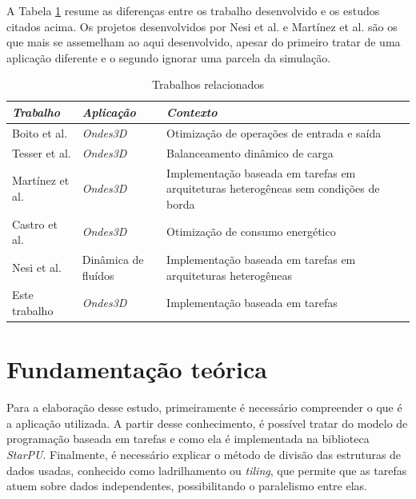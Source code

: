 \documentclass[cic,tc]{iiufrgs}
\begin{document}
A Tabela \ref{tbl:related_works} resume as diferenças entre os trabalho desenvolvido e os estudos citados acima. Os projetos desenvolvidos por Nesi et al. e Martínez et al. são
os que mais se assemelham ao aqui desenvolvido, apesar do primeiro tratar de uma aplicação diferente e o segundo ignorar uma parcela da simulação.

\begin{table}[htb!]
    \caption{Trabalhos relacionados}
    \begin{center}
        \begin{tabular}{l|l|p{60mm}}
            \textit{Trabalho} & \textit{Aplicação} & \textit{Contexto} \\
            \hline
            \hline
            Boito et al.    & \textit{Ondes3D} & Otimização de operações de entrada e saída \\
            Tesser et al.   & \textit{Ondes3D} & Balanceamento dinâmico de carga             \\
            Martínez et al. & \textit{Ondes3D} & Implementação baseada em tarefas em arquiteturas heterogêneas sem condições de borda             \\
            Castro et al.   & \textit{Ondes3D} & Otimização de consumo energético             \\
            Nesi et al.     & Dinâmica de fluídos & Implementação baseada em tarefas em arquiteturas heterogêneas \\
            Este trabalho   & \textit{Ondes3D} & Implementação baseada em tarefas             \\
            \hline
        \end{tabular}
    \end{center}
    \label{tbl:related_works}
\end{table}

\chapter{Fundamentação teórica}
Para a elaboração desse estudo, primeiramente é necessário compreender o que é a aplicação utilizada. A partir desse conhecimento, é possível tratar do modelo de programação
baseada em tarefas e como ela é implementada na biblioteca \textit{StarPU}. Finalmente, é necessário explicar o método de divisão das estruturas de dados usadas, conhecido como
ladrilhamento ou \textit{tiling}, que permite que as tarefas atuem sobre dados independentes, possibilitando o paralelismo entre elas.
\end{document}
